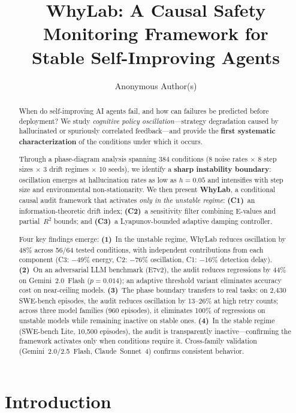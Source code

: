 \documentclass{article}
\title{WhyLab: A Causal Safety Monitoring Framework for\\
Stable Self-Improving Agents}
\author{
  Anonymous Author(s)
}
\begin{document}
\maketitle

\begin{abstract}
When do self-improving AI agents fail, and how can failures be predicted before deployment?
We study \emph{cognitive policy oscillation}---strategy degradation caused by hallucinated or spuriously correlated feedback---and provide the \textbf{first systematic characterization} of the conditions under which it occurs.

Through a phase-diagram analysis spanning 384 conditions (8 noise rates $\times$ 8 step sizes $\times$ 3 drift regimes $\times$ 10 seeds), we identify a \textbf{sharp instability boundary}: oscillation emerges at hallucination rates as low as $h{=}0.05$ and intensifies with step size and environmental non-stationarity.
We then present \textbf{WhyLab}, a conditional causal audit framework that activates \emph{only in the unstable regime}:
\textbf{(C1)}~an information-theoretic drift index;
\textbf{(C2)}~a sensitivity filter combining E-values and partial~$R^2$ bounds; and
\textbf{(C3)}~a Lyapunov-bounded adaptive damping controller.

Four key findings emerge:
\textbf{(1)}~In the unstable regime, WhyLab reduces oscillation by 48\% across 56/64 tested conditions, with independent contributions from each component (C3: $-$49\% energy, C2: $-$76\% oscillation, C1: $-$16\% detection delay).
\textbf{(2)}~On an adversarial LLM benchmark (E7v2), the audit reduces regressions by 44\% on Gemini~2.0~Flash ($p{=}0.014$); an adaptive threshold variant eliminates accuracy cost on near-ceiling models.
\textbf{(3)}~The phase boundary transfers to real tasks: on 2{,}430 SWE-bench episodes, the audit reduces oscillation by 13--26\% at high retry counts; across three model families (960 episodes), it eliminates 100\% of regressions on unstable models while remaining inactive on stable ones.
\textbf{(4)}~In the stable regime (SWE-bench Lite, 10{,}500 episodes), the audit is transparently inactive---confirming the framework activates only when conditions require it.
Cross-family validation (Gemini~2.0/2.5~Flash, Claude~Sonnet~4) confirms consistent behavior.
\end{abstract}


\section{Introduction}
\label{sec:intro}
\end{document}
